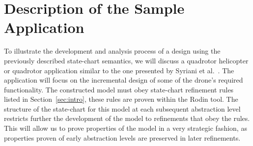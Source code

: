 \section{Description of the Sample Application}
\label{sec:descr-sample-appl}

To illustrate the development and analysis process of a design using the previously described 
state-chart semantics, we will discuss a quadrotor helicopter or quadrotor application similar to 
the one presented by Syriani et al.~\cite{Syriani_2019}. 
The application will focus on the incremental design of some of the drone's required functionality.
The constructed model must obey state-chart refinement rules listed in Section~\ref{sec:intro}, these rules are proven within the Rodin tool.
The structure of the state-chart for this model at each subsequent abstraction level restricts further the development of the model to refinements that obey the rules. 
This will allow us to prove properties of the model in a very strategic fashion, as properties proven of early abstraction levels are preserved in later refinements.

